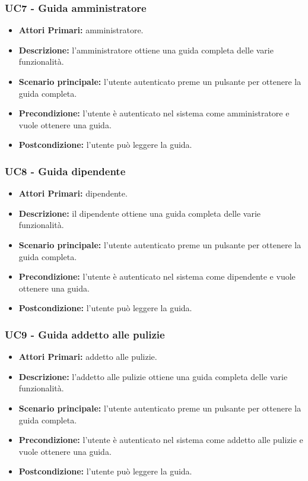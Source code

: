\subsubsection{ UC7 - Guida amministratore}
\begin{itemize}
	\item\textbf{Attori Primari:} 
	amministratore.
	\item\textbf{Descrizione:} 
	l'amministratore ottiene una guida completa delle varie funzionalità.
	\item\textbf{Scenario principale:} 
	l'utente autenticato preme un pulsante per ottenere la guida completa.
	\item\textbf{Precondizione:} 
	l'utente è autenticato nel sistema come amministratore e vuole ottenere una guida.
	\item\textbf{Postcondizione:}
	l'utente può leggere la guida.
\end{itemize}

\subsubsection{ UC8 - Guida dipendente}
\begin{itemize}
	\item\textbf{Attori Primari:} 
	dipendente.
	\item\textbf{Descrizione:} 
	il dipendente ottiene una guida completa delle varie funzionalità.
	\item\textbf{Scenario principale:} 
	l'utente autenticato preme un pulsante per ottenere la guida completa.
	\item\textbf{Precondizione:} 
	l'utente è autenticato nel sistema come dipendente e vuole ottenere una guida.
	\item\textbf{Postcondizione:}
	l'utente può leggere la guida.
\end{itemize}

\subsubsection{ UC9 - Guida addetto alle pulizie}
\begin{itemize}
	\item\textbf{Attori Primari:} 
	addetto alle pulizie.
	\item\textbf{Descrizione:} 
	l'addetto alle pulizie ottiene una guida completa delle varie funzionalità.
	\item\textbf{Scenario principale:} 
	l'utente autenticato preme un pulsante per ottenere la guida completa.
	\item\textbf{Precondizione:} 
	l'utente è autenticato nel sistema come addetto alle pulizie e vuole ottenere una guida.
	\item\textbf{Postcondizione:}
	l'utente può leggere la guida.
\end{itemize}

